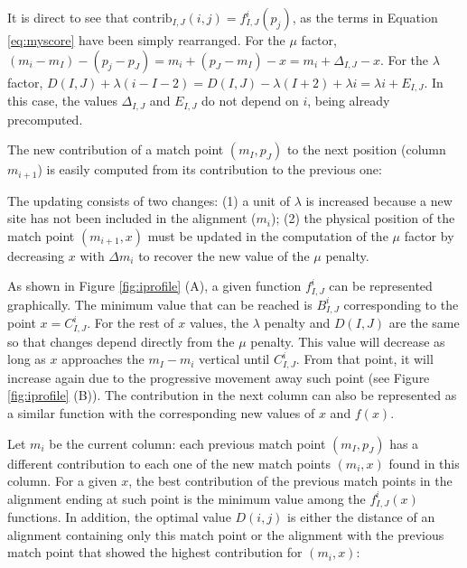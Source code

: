 {It is direct to see that $\mbox{contrib}_{I,J} (i,j) = f_{I,J}^i(p_j)$, as
the terms in Equation \ref{eq:myscore} have been simply rearranged. For the $\mu$ factor,
$(m_i - m_I) - (p_j - p_J) = m_i + (p_J - m_I) - x = m_i + \Delta_{I,J} - x$. For the $\lambda$ factor,
$D(I,J) + \lambda(i-I-2) = D(I,J) - \lambda(I+2) + \lambda i = \lambda i + E_{I,J}$. In this case, the 
values $\Delta_{I,J}$ and $E_{I,J}$ do not depend on $i$, being already precomputed.

The new contribution of a match point $(m_I,p_J)$ to the next position (column $m_{i+1}$) is easily computed
from its contribution to the previous one:

\begin{center}
\end{center}

The updating consists of two changes: (1) a unit of $\lambda$ is increased because a new site has not been included in the 
alignment ($m_i$); (2) the physical position of the match point $(m_{i+1},x)$ must be updated in the computation of
the $\mu$ factor by decreasing $x$ with $\Delta m_i$ to recover the new value of the $\mu$ penalty.

As shown in Figure \ref{fig:iprofile} (A), a given function $f_{I,J}^i$ can be represented graphically. The minimum value 
that can be reached is $B_{I,J}^i$ corresponding to the point $x = C_{I,J}^i$. For the rest of $x$ values, the $\lambda$
penalty and $D(I,J)$ are the same so that changes depend directly from the $\mu$ penalty. This value will decrease as
long as $x$ approaches the $m_I - m_i$ vertical until $C_{I,J}^i$. From that point, it will increase again due to the
progressive movement away such point (see Figure \ref{fig:iprofile} (B)). The contribution in the next column can also be
represented as a similar function with the corresponding new values of $x$ and $f(x)$.

Let $m_i$ be the current column: each previous match point $(m_I,p_J)$ has a different contribution to each one of the
new match points $(m_i,x)$ found in this column. For a given $x$, the best contribution of the previous match points in the 
alignment ending at such point is the minimum value among the $f_{I,J}^i(x)$ functions. In addition, the optimal value
$D(i,j)$ is either the distance of an alignment containing only this match point or the alignment with the previous
match point that showed the highest contribution for $(m_i,x)$:

}
